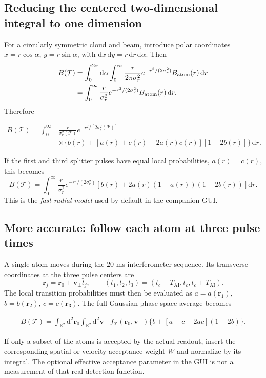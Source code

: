 \documentclass[11pt,a4paper]{article}
\numberwithin{equation}{section}
\newcommand{\Tat}{\mathcal{T}}
\newcommand{\Tai}{T_{\mathrm{AI}}}
\newcommand{\dd}{\mathrm{d}}
\begin{document}
\subsection{Reducing the centered two-dimensional integral to one dimension}

For a circularly symmetric cloud and beam, introduce polar coordinates
$x=r\cos\alpha$, $y=r\sin\alpha$, with
$\dd x\,\dd y=r\,\dd r\,\dd\alpha$.
Then
\begin{align}
B(\Tat)&=\int_0^{2\pi}\dd\alpha\int_0^\infty
\frac{r}{2\pi\sigma_r^2}
 e^{-r^2/(2\sigma_r^2)}B_{\rm atom}(r)\,\dd r\\
&=\int_0^\infty\frac{r}{\sigma_r^2}
 e^{-r^2/(2\sigma_r^2)}B_{\rm atom}(r)\,\dd r.
\end{align}
Therefore
\begin{keybox}
\begin{equation}\label{eq:Bradial}
\boxed{\begin{aligned}
B(\Tat)=\int_0^\infty &\frac{r}{\sigma_r^2(\Tat)}
 e^{-r^2/[2\sigma_r^2(\Tat)]}\\
&\times\Big\{b(r)+[a(r)+c(r)-2a(r)c(r)][1-2b(r)]\Big\}\,\dd r.
\end{aligned}}
\end{equation}
\end{keybox}
If the first and third splitter pulses have equal local probabilities,
$a(r)=c(r)$, this becomes
\begin{equation}\label{eq:Bradialsym}
\boxed{B(\Tat)=\int_0^\infty \frac{r}{\sigma_r^2}
 e^{-r^2/(2\sigma_r^2)}\left[b(r)+2a(r)(1-a(r))(1-2b(r))\right]\dd r.}
\end{equation}
This is the \emph{fast radial model} used by default in the companion GUI.

\subsection{More accurate: follow each atom at three pulse times}

A single atom moves during the $20$-ms interferometer sequence. Its
transverse coordinates at the three pulse centers are
\begin{equation}
\bm r_j=\bm r_0+\bm v_\perp t_j,
\qquad(t_1,t_2,t_3)=(t_c-\Tai,t_c,t_c+\Tai).
\end{equation}
The local transition probabilities must then be evaluated as
$a=a(\bm r_1)$, $b=b(\bm r_2)$, $c=c(\bm r_3)$. The full Gaussian
phase-space average becomes
\begin{keybox}
\begin{equation}\label{eq:B4d}
\boxed{\begin{aligned}
B(\Tat)=\int_{\mathbb R^2}\dd^2\bm r_0
\int_{\mathbb R^2}\dd^2\bm v_\perp\;
 f_{\Tat}(\bm r_0,\bm v_\perp)
 \Big\{b+[a+c-2ac](1-2b)\Big\}.
\end{aligned}}
\end{equation}
\end{keybox}
If only a subset of the atoms is accepted by the actual readout, insert the
corresponding spatial or velocity acceptance weight $W$ and normalize by its
integral. The optional effective acceptance parameter in the GUI is not a
measurement of that real detection function.
\end{document}
